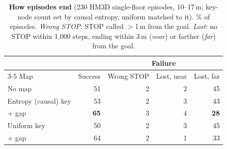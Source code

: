 \begin{table}[H]
\centering
\scriptsize
\setlength{\tabcolsep}{2.5pt}
\caption{\textbf{How episodes end} (230 HM3D single-floor episodes, 10--17\,m; key-node count set by causal entropy, uniform matched to it). \% of episodes. \emph{Wrong STOP}: STOP called $>$1\,m from the goal. \emph{Lost}: no STOP within 1{,}000 steps, ending within 3\,m (\emph{near}) or farther (\emph{far}) from the goal.}
\label{tab:failures}
\begin{tabular}{@{}lrrrr@{}}
\toprule
& & \multicolumn{3}{c}{Failure} \\
\cmidrule(l){3-5}
Map & Success & Wrong STOP & Lost, near & Lost, far \\
\midrule
No map                 & 51 & 2 & 2 & 45 \\
\midrule
Entropy (causal) key   & 53 & 2 & 3 & 43 \\
\quad + gap            & \textbf{65} & 3 & 4 & \textbf{28} \\
\midrule
Uniform key            & 50 & 2 & 3 & 45 \\
\quad + gap            & 64 & 2 & 1 & 33 \\
\bottomrule
\end{tabular}
\end{table}

